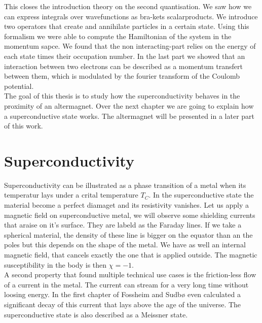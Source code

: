 \documentclass[../main.tex]{subfile}
\begin{document}
This closes the introduction theory on the second quantisation. We saw how we can express integrals over wavefunctions as bra-kets scalarproducts. 
We introduce two operators that create and annihilate particles in a certain state. Using this formalism we were able to compute the 
Hamiltonian of the system in the momentum sapce. We found that the non interacting-part relies on the energy of each state times their occupation number.
In the last part we showed that an interaction between two electrons can be described as a momentum transfert between them,
 which is modulated by the fourier transform of the Coulomb potential.\\

The goal of this thesis is to study how the superconductivity behaves in the proximity of an altermagnet. 
Over the next chapter we are going to explain how a superconductive state works. The altermagnet will be presented in a later part of this work.\\

\section{Superconductivity}
Superconductivity can be illustrated as a phase transition of a metal when its temperatur lays under a crital temperature $T_C$. In the superconductive state the material 
become a perfect diamaget and its resistivity vanishes. Let us apply a magnetic field on superconductive metal, we will observe some shielding currents that araise on it's surface.
 They are labeld as the Faraday lines. If we take a spherical
material, the density of these line is bigger on the equator than an the poles but this depends on the shape of the metal. We have as well an internal magnetic field, that cancels exactly the one
that is applied outside. The magnetic susceptibility in the body is then $\chi = -1$.\\
A second property that found multiple technical use cases is the friction-less flow of a current in the metal. The current can stream for a very long time without loosing energy. 
In the first chapter of \cite{FossheimSudbo2004} Fossheim and Sudbø even calculated a significant decay of this current that lays above the age of the universe.
The superconductive state is also described as a Meissner state.\\ 
\end{document}
